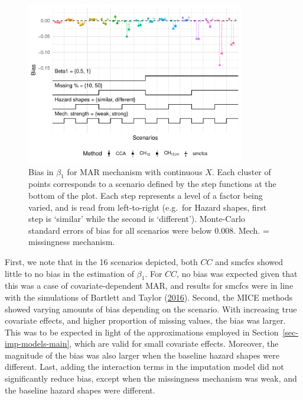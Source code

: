 \documentclass[
  letterpaper,
  DIV=11,
  numbers=noendperiod]{scrreprt}
\begin{document}
\begin{figure}

{\centering \includegraphics[width=0.85\textwidth,height=\textheight]{chapters/../figures/cause-specific-MI_MAR-B1-NLP.pdf}

}

\caption{\label{fig-beta1-MAR}Bias in \(\beta_1\) for MAR mechanism with
continuous \(X\). Each cluster of points corresponds to a scenario
defined by the step functions at the bottom of the plot. Each step
represents a level of a factor being varied, and is read from
left-to-right (e.g.~for Hazard shapes, first step is `similar' while the
second is `different'). Monte-Carlo standard errors of bias for all
scenarios were below 0.008. Mech. = missingness mechanism.}

\end{figure}

First, we note that in the 16 scenarios depicted, both \(CC\) and smcfcs
showed little to no bias in the estimation of \(\beta_1\). For \(CC\),
no bias was expected given that this was a case of covariate-dependent
MAR, and results for smcfcs were in line with the simulations of
Bartlett and Taylor
(\protect\hyperlink{ref-bartlettMissingCovariatesCompeting2016}{2016}).
Second, the MICE methods showed varying amounts of bias depending on the
scenario. With increasing true covariate effects, and higher proportion
of missing values, the bias was larger. This was to be expected in light
of the approximations employed in Section~\ref{sec-imp-models-main},
which are valid for small covariate effects. Moreover, the magnitude of
the bias was also larger when the baseline hazard shapes were different.
Last, adding the interaction terms in the imputation model did not
significantly reduce bias, except when the missingness mechanism was
weak, and the baseline hazard shapes were different.
\end{document}
